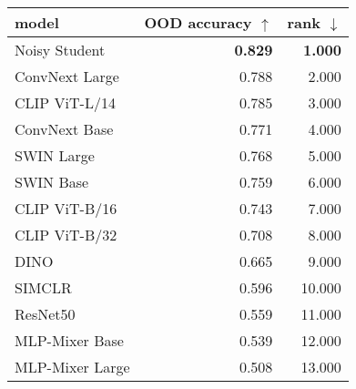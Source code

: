 \begin{tabular}{lrr}
\toprule
          model & OOD accuracy $\uparrow$ & rank $\downarrow$ \\
\midrule
  Noisy Student &          \textbf{0.829} &    \textbf{1.000} \\
 ConvNext Large &                   0.788 &             2.000 \\
  CLIP ViT-L/14 &                   0.785 &             3.000 \\
  ConvNext Base &                   0.771 &             4.000 \\
     SWIN Large &                   0.768 &             5.000 \\
      SWIN Base &                   0.759 &             6.000 \\
  CLIP ViT-B/16 &                   0.743 &             7.000 \\
  CLIP ViT-B/32 &                   0.708 &             8.000 \\
           DINO &                   0.665 &             9.000 \\
         SIMCLR &                   0.596 &            10.000 \\
       ResNet50 &                   0.559 &            11.000 \\
 MLP-Mixer Base &                   0.539 &            12.000 \\
MLP-Mixer Large &                   0.508 &            13.000 \\
\bottomrule
\end{tabular}


